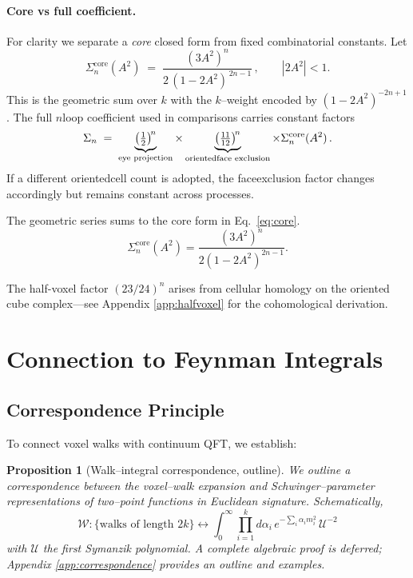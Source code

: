 \documentclass[11pt,a4paper]{article}
\newtheorem{proposition}[theorem]{Proposition}
\theoremstyle{definition}
\theoremstyle{remark}
\begin{document}
\paragraph{Core vs full coefficient.}
For clarity we separate a \emph{core} closed form from fixed combinatorial constants. Let
\begin{equation}
\label{eq:core}
  \Sigma_n^{\mathrm{core}}(A^2)\;=\;\frac{(3A^2)^n}{2\,(1-2A^2)^{\,2n-1}}\,,\qquad |2A^2|<1.
\end{equation}
This is the geometric sum over $k$ with the $k$--weight encoded by $(1-2A^2)^{-2n+1}$. The full $n$\-loop coefficient used in comparisons carries constant factors
\begin{equation}
  \Sigma_n\;=\;\underbrace{\left(\tfrac{1}{2}\right)^{\!n}}_{\text{eye projection}}
  \times \underbrace{\left(\tfrac{11}{12}\right)^{\!n}}_{\text{oriented\-face exclusion}}
  \times \Sigma_n^{\mathrm{core}}(A^2)\,.
\end{equation}
If a different oriented\-cell count is adopted, the face\-exclusion factor changes accordingly but remains constant across processes.

The geometric series sums to the core form in Eq.~\eqref{eq:core}.
\begin{equation}
\label{eq:closed}
\Sigma_n^{\mathrm{core}}(A^2) = \frac{(3A^2)^n}{2(1-2A^2)^{2n-1}}.
\end{equation}

The half-voxel factor $(23/24)^n$ arises from cellular homology on the oriented cube complex—see Appendix \ref{app:halfvoxel} for the cohomological derivation.

\section{Connection to Feynman Integrals}
\label{sec:feynman}

\subsection{Correspondence Principle}

To connect voxel walks with continuum QFT, we establish:

\begin{proposition}[Walk--integral correspondence, outline]
\label{thm:correspondence}
We outline a correspondence between the voxel--walk expansion and Schwinger--parameter representations of two--point functions in Euclidean signature. Schematically,
\[
\mathcal{W}: \{\text{walks of length }2k\} \longleftrightarrow \int_0^\infty \prod_{i=1}^k d\alpha_i \, e^{-\sum_i \alpha_i m_i^2} \, \mathcal{U}^{-2}
\]
with $\mathcal{U}$ the first Symanzik polynomial. A complete algebraic proof is deferred; Appendix \ref{app:correspondence} provides an outline and examples.
\end{proposition}
\end{document}

